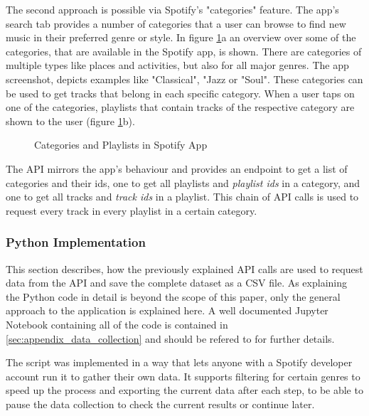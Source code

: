 The second approach is possible via Spotify's "categories" feature. The app's search tab provides a number of
categories that a user can browse to find new music in their preferred genre or style.
In figure \ref{fig:Categories and Playlists in Spotify App}a an overview over some of the categories,
that are available in the Spotify app, is shown. There are categories of multiple types like
places and activities, but also for all major genres. The app screenshot,
depicts examples like "Classical", "Jazz or "Soul".
These categories can be used to get tracks that belong in each specific category. When a user taps on
one of the categories, playlists that contain tracks of the respective category are shown to the user
(figure \ref{fig:Categories and Playlists in Spotify App}b).

\begin{figure}[H]
    \centering
    \qquad
    \caption{Categories and Playlists in Spotify App}%
    \label{fig:Categories and Playlists in Spotify App}%
\end{figure}

The API mirrors the app's behaviour and provides an endpoint to get a list of categories and their ids,
one to get all playlists and \emph{playlist ids} in a category, and one to get all tracks and \emph{track ids} in
a playlist. This chain of API calls is used to request every track in every playlist in a certain category.


\subsubsection{Python Implementation}

This section describes, how the previously explained API calls are used to request data from the API
and save the complete dataset as a CSV file.
As explaining the Python code in detail is beyond the scope of this paper, only the general 
approach to the application is explained here. 
A well documented Jupyter Notebook containing all of the code is contained in \ref{sec:appendix_data_collection} and should be
refered to for further details.

The script was implemented in a way that lets anyone with a Spotify
developer account run it to gather their own data.
It supports filtering for certain genres to speed up the process and exporting the current data after each step,
to be able to pause the data collection to check the current results or continue later.

